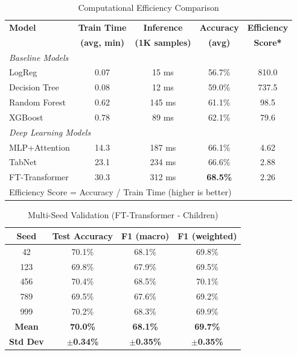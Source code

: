 \documentclass{article}
\begin{document}

\begin{table}[ht]
\centering
\caption{Computational Efficiency Comparison}
\label{tab:efficiency}
\begin{tabular}{lcccc}
\toprule
\textbf{Model} & \textbf{Train Time} & \textbf{Inference} & \textbf{Accuracy} & \textbf{Efficiency} \\
& \textbf{(avg, min)} & \textbf{(1K samples)} & \textbf{(avg)} & \textbf{Score*} \\
\midrule
\multicolumn{5}{l}{\textit{Baseline Models}} \\
LogReg        & 0.07  & 15 ms  & 56.7\% & 810.0 \\
Decision Tree & 0.08  & 12 ms  & 59.0\% & 737.5 \\
Random Forest & 0.62  & 145 ms & 61.1\% & 98.5 \\
XGBoost       & 0.78  & 89 ms  & 62.1\% & 79.6 \\
\midrule
\multicolumn{5}{l}{\textit{Deep Learning Models}} \\
MLP+Attention & 14.3  & 187 ms & 66.1\% & 4.62 \\
TabNet        & 23.1  & 234 ms & 66.6\% & 2.88 \\
FT-Transformer& 30.3  & 312 ms & \textbf{68.5\%} & 2.26 \\
\midrule
\multicolumn{5}{l}{\footnotesize *Efficiency Score = Accuracy / Train Time (higher is better)} \\
\bottomrule
\end{tabular}
\end{table}


\begin{table}[ht]
\centering
\caption{Multi-Seed Validation (FT-Transformer - Children)}
\label{tab:multiseed}
\begin{tabular}{cccc}
\toprule
\textbf{Seed} & \textbf{Test Accuracy} & \textbf{F1 (macro)} & \textbf{F1 (weighted)} \\
\midrule
42  & 70.1\% & 68.1\% & 69.8\% \\
123 & 69.8\% & 67.9\% & 69.5\% \\
456 & 70.4\% & 68.5\% & 70.1\% \\
789 & 69.5\% & 67.6\% & 69.2\% \\
999 & 70.2\% & 68.3\% & 69.9\% \\
\midrule
\textbf{Mean}   & \textbf{70.0\%} & \textbf{68.1\%} & \textbf{69.7\%} \\
\textbf{Std Dev} & \textbf{$\pm$0.34\%} & \textbf{$\pm$0.35\%} & \textbf{$\pm$0.35\%} \\
\bottomrule
\end{tabular}
\end{table}
\end{document}
